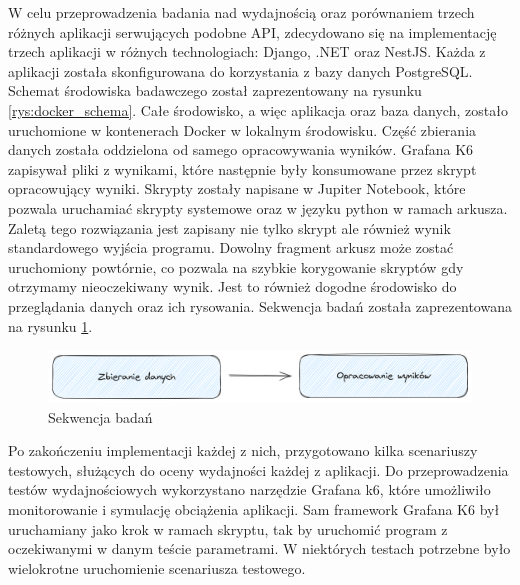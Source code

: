 W celu przeprowadzenia badania nad wydajnością oraz porównaniem trzech różnych aplikacji serwujących podobne API, zdecydowano się na implementację trzech aplikacji w różnych technologiach: Django, .NET oraz NestJS.
Każda z aplikacji została skonfigurowana do korzystania z bazy danych PostgreSQL.
Schemat środowiska badawczego został zaprezentowany na rysunku \ref{rys:docker_schema}.
Całe środowisko, a więc aplikacja oraz baza danych, zostało uruchomione w kontenerach Docker w lokalnym środowisku.
Część zbierania danych została oddzielona od samego opracowywania wyników.
Grafana K6 zapisywał pliki z wynikami, które następnie były konsumowane przez skrypt opracowujący wyniki.
Skrypty zostały napisane w Jupiter Notebook, które pozwala uruchamiać skrypty systemowe oraz w języku python w ramach arkusza.
Zaletą tego rozwiązania jest zapisany nie tylko skrypt ale również wynik standardowego wyjścia programu.
Dowolny fragment arkusz może zostać uruchomiony powtórnie, co pozwala na szybkie korygowanie skryptów gdy otrzymamy nieoczekiwany wynik.
Jest to również dogodne środowisko do przeglądania danych oraz ich rysowania.
Sekwencja badań została zaprezentowana na rysunku \ref{rys:test_flow}.

\begin{figure}[!hb]
	\centering \includegraphics[width=1\linewidth]{rysunki/test_flow.png}
	\caption{Sekwencja badań}
	\label{rys:test_flow}
\end{figure}

Po zakończeniu implementacji każdej z nich, przygotowano kilka scenariuszy testowych, służących do oceny wydajności każdej z aplikacji.
Do przeprowadzenia testów wydajnościowych wykorzystano narzędzie Grafana k6, które umożliwiło monitorowanie i symulację obciążenia aplikacji.
Sam framework Grafana K6 był uruchamiany jako krok w ramach skryptu, tak by uruchomić program z oczekiwanymi w danym teście parametrami.
W niektórych testach potrzebne było wielokrotne uruchomienie scenariusza testowego.


